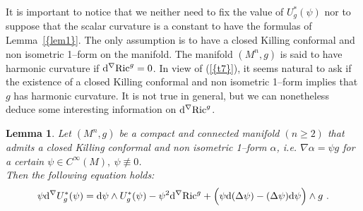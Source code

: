\documentclass[a4paper,11pt,leqno]{amsart}
\numberwithin{equation}{section}
\theoremstyle{main}
\newtheorem{lem} [thm] {\bf  Lemma}
\begin{document}
It is important to notice that we neither need to fix the value of $U_g^* (\psi)$ nor to suppose that the scalar curvature is a constant to have the formulas of Lemma~{\ref{{lem1}}}. The only assumption is to have a closed Killing conformal and non isometric 1--form on the manifold. The manifold $(M^n,g)$ is said to have harmonic curvature if ${{\rm d}} ^\nabla {\operatorname{Ric}}^g=0$. In view of ({\ref{{t7}}}), it seems natural to ask if the existence of a closed Killing conformal and non isometric 1--form implies that $g$ has harmonic curvature. It is not true in general, but we can nonetheless deduce some interesting information on ${{\rm d}} ^\nabla {\operatorname{Ric}}^g$.

\begin{lem}\label{lem2}
Let $(M^n, g)$ be a compact and connected manifold $(n\ge 2)$ that admits a closed Killing conformal and non isometric 1--form $\alpha$, i.e. $ \nabla \alpha= \psi g $ for a certain  $\psi\in C^{\infty}(M),\ \psi \not\equiv 0$. \\
Then the following equation holds:
\begin{equation}\label{eq}
		\psi{{\rm d}} ^\nabla U_g^* (\psi) = {{\rm d}} \psi \wedge U_g^*(\psi) -\psi^2 {{\rm d}} ^\nabla{\operatorname{Ric}}^g +\Big( \psi{{\rm d}} (\Delta \psi) - (\Delta \psi) {{\rm d}} \psi\Big)\wedge g \ .
\end{equation} 
\end{lem}
\end{document}
